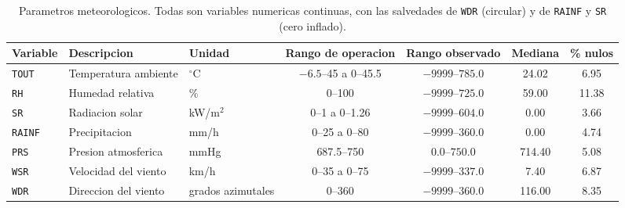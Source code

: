 \begin{table}[pos=t]
  \centering
  \caption{Parametros meteorologicos. Todas son variables numericas continuas,
    con las salvedades de \texttt{WDR} (circular) y de \texttt{RAINF} y
    \texttt{SR} (cero inflado).}
  \label{tab:dic-meteo}
  \small
  \begin{tabular}{lllcccc}
    \toprule
    Variable & Descripcion & Unidad & Rango de operacion & Rango observado & Mediana & \% nulos \\
    \midrule
    \texttt{TOUT}  & Temperatura ambiente & $^{\circ}$C        & $-6.5$--45 a 0--45.5 & $-9999$--$785.0$ & 24.02  & 6.95  \\
    \texttt{RH}    & Humedad relativa     & \%                 & 0--100               & $-9999$--$725.0$ & 59.00  & 11.38 \\
    \texttt{SR}    & Radiacion solar      & kW/m$^2$           & 0--1 a 0--1.26       & $-9999$--$604.0$ & 0.00   & 3.66  \\
    \texttt{RAINF} & Precipitacion        & mm/h               & 0--25 a 0--80        & $-9999$--$360.0$ & 0.00   & 4.74  \\
    \texttt{PRS}   & Presion atmosferica  & mmHg               & 687.5--750           & $0.0$--$750.0$   & 714.40 & 5.08  \\
    \texttt{WSR}   & Velocidad del viento & km/h               & 0--35 a 0--75        & $-9999$--$337.0$ & 7.40   & 6.87  \\
    \texttt{WDR}   & Direccion del viento & grados azimutales  & 0--360               & $-9999$--$360.0$ & 116.00 & 8.35  \\
    \bottomrule
  \end{tabular}
\end{table}

